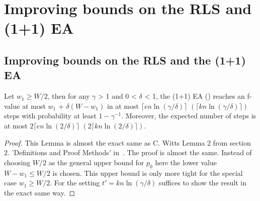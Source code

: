 \chapter{Improving bounds on the RLS and (1+1) EA}\label{ch:Content1}

\section{Improving bounds on the RLS and the (1+1) EA}

\begin{lemma}\label{lemma:CWittRefined}
    Let $w_1\ge W/2$, then for any $\gamma$ > 1 and 0 < $\delta$ < 1, the (1+1) EA (\RLSR[k]) reaches an f-value at most $w_1$ + $\delta(W-w_1)$ in at most $\lceil en\ln(\gamma/\delta)\rceil$ $(\lceil kn\ln(\gamma/\delta)\rceil)$ steps with probability at least $1-\gamma^{-1}$. Moreover, the expected number of steps is at most $2\lceil en\ln(2/\delta)\rceil$ $(2\lceil kn\ln(2/\delta)\rceil)$.
\end{lemma}
\begin{proof}
    This Lemma is almost the exact same as C. Witts  Lemma 2 from section 2. 'Definitions and Proof Methods' in~\cite{witt2005worst}.
    The proof is almost the same.
    Instead of choosing $W/2$ as the general upper bound for $p_0$ here the lower value $W-w_1\le W/2$ is chosen.
    This upper bound is only more tight for the special case $w_1\ge W/2$.
    For the \RLSR[k] setting $t'=kn\ln(\gamma/\delta)$ suffices to show the result in the exact same way.
\end{proof}

